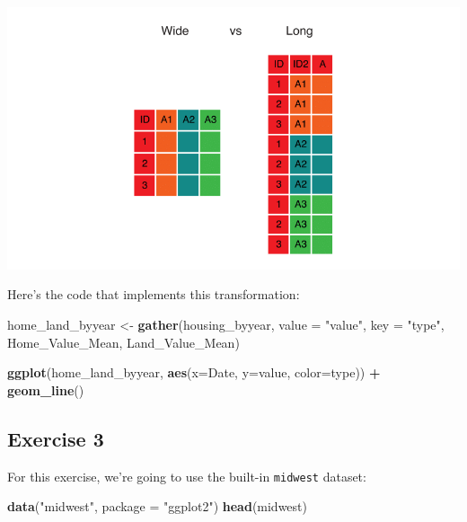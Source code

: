 \documentclass[]{book}
\newenvironment{Shaded}{\begin{snugshade}}{\end{snugshade}}
\newcommand{\KeywordTok}[1]{\textcolor[rgb]{0.13,0.29,0.53}{\textbf{#1}}}
\newcommand{\DataTypeTok}[1]{\textcolor[rgb]{0.13,0.29,0.53}{#1}}
\newcommand{\StringTok}[1]{\textcolor[rgb]{0.31,0.60,0.02}{#1}}
\newcommand{\OperatorTok}[1]{\textcolor[rgb]{0.81,0.36,0.00}{\textbf{#1}}}
\newcommand{\NormalTok}[1]{#1}
\begin{document}
\includegraphics{R/Rgraphics/images/wide_vs_long.png}

Here's the code that implements this transformation:

\begin{Shaded}
\begin{Highlighting}[]
\NormalTok{home_land_byyear <-}\StringTok{ }\KeywordTok{gather}\NormalTok{(housing_byyear,}
                           \DataTypeTok{value =} \StringTok{"value"}\NormalTok{,}
                           \DataTypeTok{key =} \StringTok{"type"}\NormalTok{,}
\NormalTok{                           Home_Value_Mean, Land_Value_Mean)}

\KeywordTok{ggplot}\NormalTok{(home_land_byyear, }\KeywordTok{aes}\NormalTok{(}\DataTypeTok{x=}\NormalTok{Date, }\DataTypeTok{y=}\NormalTok{value, }\DataTypeTok{color=}\NormalTok{type)) }\OperatorTok{+}
\StringTok{  }\KeywordTok{geom_line}\NormalTok{()}
\end{Highlighting}
\end{Shaded}

\subsection{Exercise 3}\label{exercise-3-2}

For this exercise, we're going to use the built-in \texttt{midwest}
dataset:

\begin{Shaded}
\begin{Highlighting}[]
\KeywordTok{data}\NormalTok{(}\StringTok{"midwest"}\NormalTok{, }\DataTypeTok{package =} \StringTok{"ggplot2"}\NormalTok{)}
\KeywordTok{head}\NormalTok{(midwest)}
\end{Highlighting}
\end{Shaded}
\end{document}
